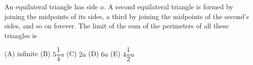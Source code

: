 An equilateral triangle has side $a$. A second equilateral triangle is formed by joining the midpoints of its sides, a third by joining the midpoints of the second's sides, and so on forever. The limit of the sum of the perimeters of all these triangles is

(A) infinite \quad (B) $5\dfrac{1}{4}a$ \quad (C) $2a$ \quad (D) $6a$ \quad (E) $4\dfrac{1}{2}a$
